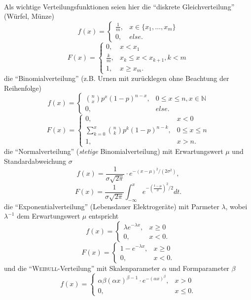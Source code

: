 \ \\
Als wichtige Verteilungsfunktionen seien hier die ``diskrete Gleichverteilung'' (Würfel, Münze)
\[
	f(x) = \left\lbrace
		\begin{array}{ll}
			\frac{1}{m}, & x \in \{x_1, \ldots, x_m\}\\
			0, & else.
		\end{array}
	\right.
\]
\[
	F(x) = \left\lbrace
		\begin{array}{ll}
			0, & x < x_1\\
			\frac{k}{m}, & x_k \leq x < x_{k+1}, k < m\\
			1, & x \geq x_m.
		\end{array}
	\right.
\]
die ``Binomialverteilung'' (z.B. Urnen mit zurücklegen ohne Beachtung der Reihenfolge)
\[
	f(x) = \left\lbrace
		\begin{array}{ll}
			\binom{n}{x}p^x(1-p)^{n-x}, & 0 \leq x \leq n, x \in \mathbb{N}\\
			0, & else.
		\end{array}
	\right.
\]
\[
	F(x) = \left\lbrace
		\begin{array}{ll}
			0, & x < 0\\
			\sum_{k=0}^x \binom{n}{k}p^k(1-p)^{n-k}, & 0 \leq x \leq n\\
			1, & x > n.
		\end{array}
	\right.
\]
die ``Normalverteilung'' (\textit{stetige} Binomialverteilung) mit Erwartungswert \(\mu\) und Standardabweichung \(\sigma\)
\[
	f(x) = \frac{1}{\sigma\sqrt{2\pi}} \cdot e^{-(x-\mu)^2/(2\sigma^2)},
\]
\[
	F(x) = \frac{1}{\sigma\sqrt{2\pi}} \int_{-\infty}^x e^{-\left(\frac{t-\mu}{\sigma}\right)^2 / 2} dt.
\]
die ``Exponentialverteilung'' (Lebensdauer Elektrogeräte) mit Parmeter \(\lambda\), wobei \(\lambda^{-1}\) dem Erwartungswert \(\mu\) entspricht
\[
	f(x) = \left\lbrace
		\begin{array}{ll}
			\lambda e^{-\lambda x}, & x \geq 0\\
			0, & x < 0.
		\end{array}
	\right.
\]
\[
	F(x) = \left\lbrace
		\begin{array}{ll}
			1-e^{-\lambda x}, & x \geq 0\\
			0, & x < 0.
		\end{array}
	\right.
\]
und die ``\textsc{Weibull}-Verteilung'' mit Skalenparameter \(\alpha\) und Formparameter \(\beta\)
\[
	f(x) = \left\lbrace
		\begin{array}{ll}
			\alpha\beta(\alpha x)^{\beta-1}\cdot e^{-(\alpha x)^\beta}, & x > 0\\
			0, & x \leq 0.
		\end{array}
	\right.
\]
